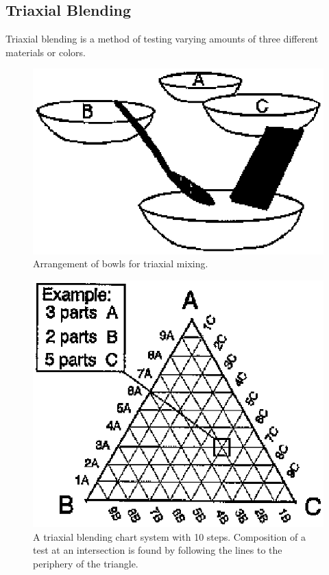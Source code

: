 \subsection{Triaxial Blending}
Triaxial blending is a method of testing varying amounts of three different 
materials or colors.
\begin{figure}[htbp!]
  \centering
  \includegraphics[width=0.7\linewidth]{img/triaxialbowls.eps}
  \caption{Arrangement of bowls for triaxial mixing.}
  \label{fig:triaxialbowls}
\end{figure}
\begin{figure}[htbp!]
  \centering
  \includegraphics[width=0.7\linewidth]{img/triaxial10.eps}
  \caption{A triaxial blending chart system with 10 steps. Composition of a 
    test at an intersection is found by following the lines to the periphery of 
    the triangle.}
  \label{fig:triaxial10}
\end{figure}
